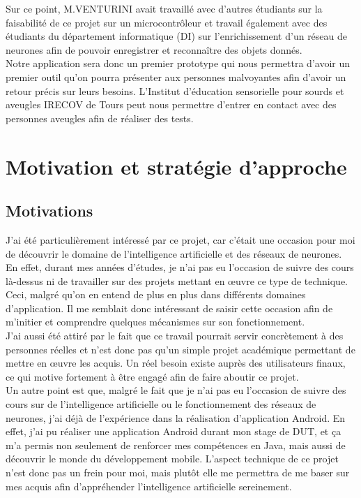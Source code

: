\documentclass[UTF8]{EPURapport}
\begin{document}
Sur ce point, M.VENTURINI avait travaillé avec d'autres étudiants sur la faisabilité de ce projet sur un microcontrôleur et travail également avec des étudiants du département informatique (DI) sur l'enrichissement d'un réseau de neurones afin de pouvoir enregistrer et reconnaître des objets donnés.\\

Notre application sera donc un premier prototype qui nous permettra d'avoir un premier outil qu'on pourra présenter aux personnes malvoyantes afin d'avoir un retour précis sur leurs besoins. L’Institut d’éducation sensorielle pour sourds et aveugles IRECOV de Tours peut nous permettre d'entrer en contact avec des personnes aveugles afin de réaliser des tests.\\

\chapter{Motivation et stratégie d'approche}

\section{Motivations}

J'ai été particulièrement intéressé par ce projet, car c'était une occasion pour moi de découvrir le domaine de l'intelligence artificielle et des réseaux de neurones. En effet, durant mes années d'études, je n'ai pas eu l'occasion de suivre des cours là-dessus ni de travailler sur des projets mettant en œuvre ce type de technique. Ceci, malgré qu'on en entend de plus en plus dans différents domaines d'application. Il me semblait donc intéressant de saisir cette occasion afin de m'initier et comprendre quelques mécanismes sur son fonctionnement.\\

J'ai aussi été attiré par le fait que ce travail pourrait servir concrètement à des personnes réelles et n'est donc pas qu'un simple projet académique permettant de mettre en œuvre les acquis. Un réel besoin existe auprès des utilisateurs finaux, ce qui motive fortement à être engagé afin de faire aboutir ce projet.\\

Un autre point est que, malgré le fait que je n'ai pas eu l'occasion de suivre des cours sur de l'intelligence artificielle ou le fonctionnement des réseaux de neurones, j'ai déjà de l'expérience dans la réalisation d'application Android. En effet, j'ai pu réaliser une application Android durant mon stage de DUT, et ça m'a permis non seulement de renforcer mes compétences en Java, mais aussi de découvrir le monde du développement mobile. L'aspect technique de ce projet n'est donc pas un frein pour moi, mais plutôt elle me permettra de me baser sur mes acquis afin d'appréhender l'intelligence artificielle sereinement.\\
\end{document}
